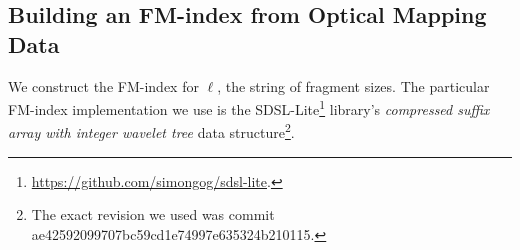 \subsection{Building an FM-index from Optical Mapping Data}
\label{subsec-buildfm}



We construct the FM-index for $\ell$, the string of 
fragment sizes. 
The particular FM-index implementation we use is the SDSL-Lite\footnote{\url{https://github.com/simongog/sdsl-lite}.} \cite{SDSL}
library's \emph{compressed suffix array with integer wavelet tree} data structure\footnote{The exact revision we used was commit ae42592099707bc59cd1e74997e635324b210115.}.


